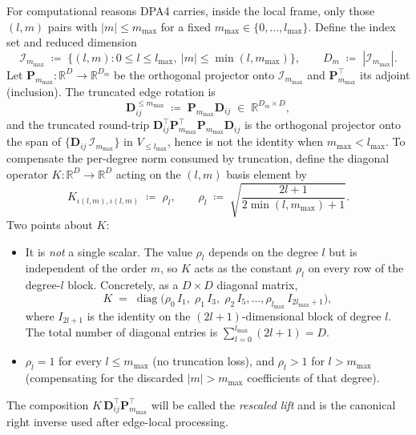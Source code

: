 \documentclass[11pt,a4paper]{article}
\DeclareMathOperator{\diag}{diag}
\newcommand{\R}{\mathbb{R}}
\newcommand{\bD}{\bm{D}}
\newcommand{\bP}{\bm{P}}
\newcommand{\lmax}{l_{\max}}
\newcommand{\mmax}{m_{\max}}
\newcommand{\Idx}{\mathcal{I}}
\theoremstyle{plain}
\theoremstyle{definition}
\theoremstyle{remark}
\begin{document}
For computational reasons DPA4 carries, inside the local frame, only those
$(l,m)$ pairs with $|m|\leq\mmax$ for a fixed $\mmax\in\{0,\dots,\lmax\}$.
Define the index set and reduced dimension
\begin{equation}\label{eq:Imm}
    \Idx_{\mmax}\;\coloneqq\;\bigl\{(l,m):0\leq l\leq\lmax,\ |m|\leq\min(l,\mmax)\bigr\},\qquad
    D_m\;\coloneqq\;|\Idx_{\mmax}|.
\end{equation}
Let $\bP_{\mmax}:\R^{D}\to\R^{D_m}$ be the orthogonal projector onto $\Idx_{\mmax}$ and $\bP_{\mmax}^\top$ its adjoint (inclusion).
The truncated edge rotation is
\begin{equation}
    \bD_{ij}^{\le\mmax}\;\coloneqq\;\bP_{\mmax}\bD_{ij}\;\in\;\R^{D_m\times D},
\end{equation}
and the truncated round-trip $\bD_{ij}^{\top}\bP_{\mmax}^\top\bP_{\mmax}\bD_{ij}$ is the orthogonal projector onto the span of $\{\bD_{ij}\,\Idx_{\mmax}\}$ in $V_{\le\lmax}$, hence is not the identity when $\mmax<\lmax$.
To compensate the per-degree norm consumed by truncation, define the diagonal operator $K:\R^{D}\to\R^{D}$ acting on the $(l,m)$ basis element by
\begin{equation}\label{eq:rescale}
    K_{\iota(l,m),\iota(l,m)}\;\coloneqq\;\rho_l,\qquad
    \rho_l\;\coloneqq\;\sqrt{\frac{2l+1}{2\min(l,\mmax)+1}}.
\end{equation}
Two points about $K$:
\begin{itemize}[leftmargin=2em]
    \item It is \emph{not} a single scalar. The value $\rho_l$ depends on the degree $l$
          but is independent of the order $m$, so $K$ acts as the constant $\rho_l$ on
          every row of the degree-$l$ block. Concretely, as a $D\times D$ diagonal
          matrix,
          \begin{equation}\label{eq:K-block}
              K \;=\; \diag\!\bigl(\rho_0\,I_{1},\;\rho_1\,I_{3},\;\rho_2\,I_{5},\dots,\rho_{\lmax}\,I_{2\lmax+1}\bigr),
          \end{equation}
          where $I_{2l+1}$ is the identity on the $(2l+1)$-dimensional block of degree $l$.
          The total number of diagonal entries is $\sum_{l=0}^{\lmax}(2l+1)=D$.
    \item $\rho_l=1$ for every $l\le\mmax$ (no truncation loss), and $\rho_l>1$ for $l>\mmax$ (compensating for the discarded $|m|>\mmax$ coefficients of that degree).
\end{itemize}
The composition $K\,\bD_{ij}^{\top}\bP_{\mmax}^\top$ will be called the \emph{rescaled lift} and is the canonical right inverse used after edge-local processing.
\end{document}
